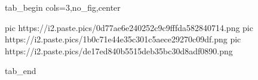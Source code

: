  
 
 
 
 


\ifcmt
  tab_begin cols=3,no_fig,center

     pic https://i2.paste.pics/0d77ae6e240252c9c9fffda582840714.png
     pic https://i2.paste.pics/1b0c71e44e35c301c5aece29270c09df.png
     pic https://i2.paste.pics/de17ed840b5515deb35bc30d8adf0890.png

  tab_end
\fi

